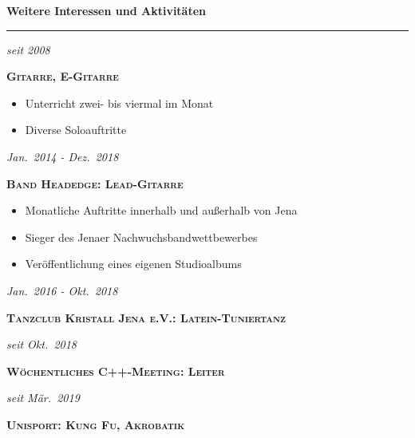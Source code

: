 \documentclass[8pt]{article}
\newcommand{\cvSectionStyle}{%
  \normalfont%
  \Large%
  \color{cvColor}%
  \bfseries%
  \sffamily%
}
\newcommand{\cvTimeStyle}{%
  \normalfont%
  \sffamily%
  \footnotesize%
  \itshape%
}
\newcommand{\cvSection}[1]{%
  \smallskip%
  {%
    \cvSectionStyle #1%
  }\\[-0.5em]
  \rule{\linewidth}{0.8pt}%
  \par%
  \smallskip%
}
\newenvironment{cvItemize}{%
  \begin{itemize}[itemsep=0mm, leftmargin=4mm]
}{%
  \end{itemize}
}
\newenvironment{cvTimeItem}[2]{
  \par
  \begin{minipage}[c]{0.15\linewidth}
    \raggedleft
    \cvTimeStyle #1
  \end{minipage}
  \quad
  \vrule
  \quad
  \begin{minipage}[t]{0.79\linewidth}
    \sffamily\textsc{\color{cvColor} \textbf{#2}}\par
    \normalfont\footnotesize\sffamily\color{cvContentColor}
}{
  \end{minipage}
  \par%
  \vspace{\baselineskip}%
}
\begin{document}
  \cvSection{Weitere Interessen und Aktivitäten}
    \begin{multicols}{2}
      \begin{cvTimeItem}{seit 2008}{Gitarre, E-Gitarre}
        \begin{cvItemize}
          \item Unterricht zwei- bis viermal im Monat
          \item Diverse Soloauftritte
        \end{cvItemize}
      \end{cvTimeItem}
      \begin{cvTimeItem}{Jan.~2014 - Dez.~2018}{Band Headedge: Lead-Gitarre}
        \begin{cvItemize}
          \item Monatliche Auftritte innerhalb und außerhalb von Jena
          \item Sieger des Jenaer Nachwuchsbandwettbewerbes
          \item Veröffentlichung eines eigenen Studioalbums
        \end{cvItemize}
      \end{cvTimeItem}
      \begin{cvTimeItem}{Jan.~2016 - Okt.~2018}{Tanzclub Kristall Jena e.V.: Latein-Tuniertanz}
      \end{cvTimeItem}
      \begin{cvTimeItem}{seit Okt.~2018}{Wöchentliches C++-Meeting: Leiter}
      \end{cvTimeItem}
      \begin{cvTimeItem}{seit Mär.~2019}{Unisport: Kung Fu, Akrobatik}
      \end{cvTimeItem}
    \end{multicols}
\end{document}
